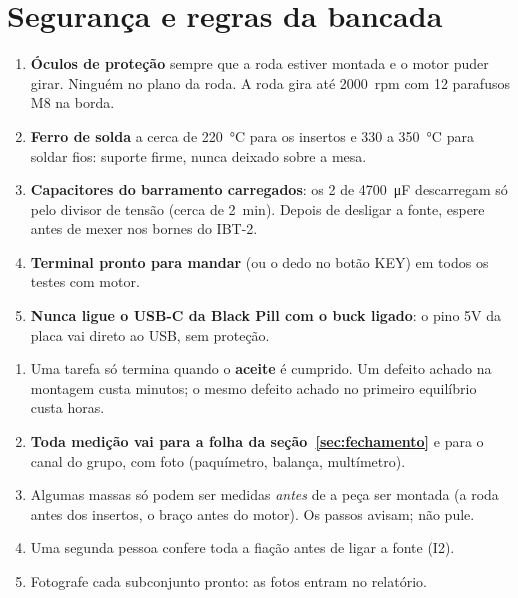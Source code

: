 \documentclass[11pt,a4paper]{article}
\newcommand{\cmd}[1]{\texttt{\detokenize{#1}}}   %
\begin{document}
\section{Segurança e regras da bancada}
\label{sec:seguranca}

\begin{atencao}[Segurança]
\begin{enumerate}[leftmargin=1.5em]
  \item \textbf{Óculos de proteção} sempre que a roda estiver montada e o motor puder
    girar. Ninguém no plano da roda. A roda gira até 2000~rpm com 12 parafusos M8 na borda.
  \item \textbf{Ferro de solda} a cerca de 220~°C para os insertos e 330 a 350~°C para
    soldar fios: suporte firme, nunca deixado sobre a mesa.
  \item \textbf{Capacitores do barramento carregados}: os 2 de \qty{4700}{\micro\farad}
    descarregam só pelo divisor de tensão (cerca de 2~min). Depois de desligar a fonte,
    espere antes de mexer nos bornes do IBT-2.
  \item \textbf{Terminal pronto para mandar \cmd{s}} (ou o dedo no botão KEY) em todos os
    testes com motor.
  \item \textbf{Nunca ligue o USB-C da Black Pill com o buck ligado}: o pino 5V da placa vai
    direto ao USB, sem proteção.
\end{enumerate}
\end{atencao}

\begin{enumerate}
  \item Uma tarefa só termina quando o \textbf{aceite} é cumprido. Um defeito achado na
    montagem custa minutos; o mesmo defeito achado no primeiro equilíbrio custa horas.
  \item \textbf{Toda medição vai para a folha da seção~\ref{sec:fechamento}} e para o canal
    do grupo, com foto (paquímetro, balança, multímetro).
  \item Algumas massas só podem ser medidas \emph{antes} de a peça ser montada (a roda antes
    dos insertos, o braço antes do motor). Os passos avisam; não pule.
  \item Uma segunda pessoa confere toda a fiação antes de ligar a fonte (I2).
  \item Fotografe cada subconjunto pronto: as fotos entram no relatório.
\end{enumerate}
\end{document}
